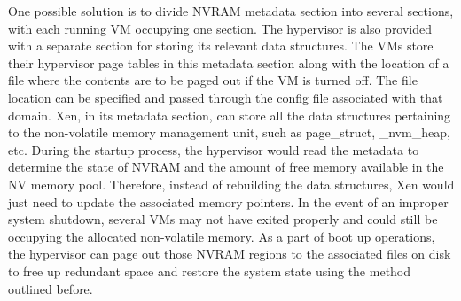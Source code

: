 One possible solution is to divide NVRAM metadata section into several sections, with each running VM occupying one section. The hypervisor is also provided with a separate section for storing its relevant data structures. The VMs store their hypervisor page tables in this metadata section along with the location of a file where the contents are to be paged out if the VM is turned off. The file location can be specified and passed through the config file associated with that domain. Xen, in its metadata section, can store all the data structures pertaining to the non-volatile memory management unit, such as page\_struct, \_nvm\_heap, etc. During the startup process, the hypervisor would read the metadata to determine the state of NVRAM and the amount of free memory available in the NV memory pool. Therefore, instead of rebuilding the data structures, Xen would just need to update the associated memory pointers. In the event of an improper system shutdown, several VMs may not have exited properly and could still be occupying the allocated non-volatile memory. As a part of boot up operations, the hypervisor can page out those NVRAM regions to the associated files on disk to free up redundant space and restore the system state using the method outlined before. 
